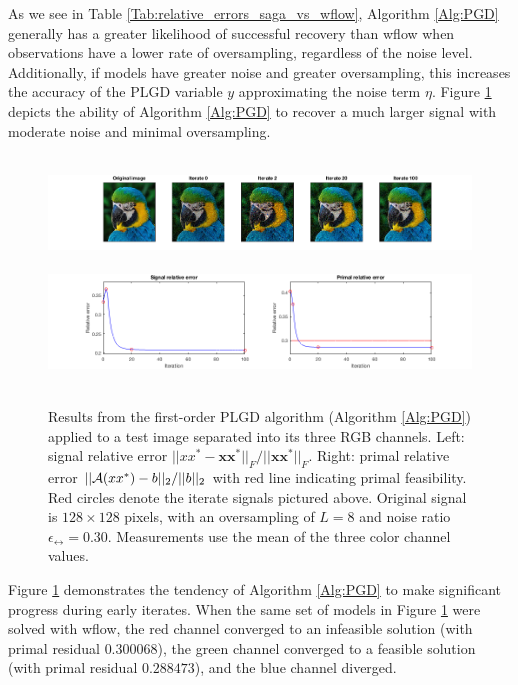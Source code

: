 As we see in Table \ref{Tab:relative_errors_saga_vs_wflow}, Algorithm \ref{Alg:PGD} generally has a greater likelihood of successful recovery than wflow when observations have a lower rate of oversampling, regardless of the noise level.  
Additionally, if models have greater noise and greater oversampling, this increases the accuracy of the PLGD variable $y$ approximating the noise term $\eta$.
Figure \ref{Fig:parrot_signal_relative_error_2} depicts the ability of Algorithm \ref{Alg:PGD} to recover a much larger signal with moderate noise and minimal oversampling.

\begin{figure}[H]
\centering
\hbox{\hspace{-1.6cm} \includegraphics[scale=0.55]{parrot_signal_iterates} }
\hbox{\hspace{-1.7cm} \includegraphics[scale=0.6]{parrot_signal_relative_error_2} }
\caption{Results from the first-order PLGD algorithm (Algorithm \ref{Alg:PGD}) applied to a test image separated into its three RGB channels.  Left: signal relative error $||xx^*- \mathbf{x}\mathbf{x}^*||_F / ||\mathbf{x}\mathbf{x}^*||_F$.  Right: primal relative error $||{\mathcal A}(xx^*)-b||_2 /  ||b||_2$ with red line indicating primal feasibility.  Red circles denote the iterate signals pictured above.  Original signal is $128 \times 128$ pixels, with an oversampling of $L = 8$ and noise ratio $\epsilon_\rel = 0.30$.  Measurements use the mean of the three color channel values.}
\label{Fig:parrot_signal_relative_error_2}
\end{figure}

Figure \ref{Fig:parrot_signal_relative_error_2} demonstrates the tendency of Algorithm \ref{Alg:PGD} to make significant progress during early iterates.  When the same set of models in Figure \ref{Fig:parrot_signal_relative_error_2} were solved with wflow, the red channel converged to an infeasible solution (with primal residual $0.300068$), the green channel converged to a feasible solution (with primal residual $0.288473$), and the blue channel diverged.  





